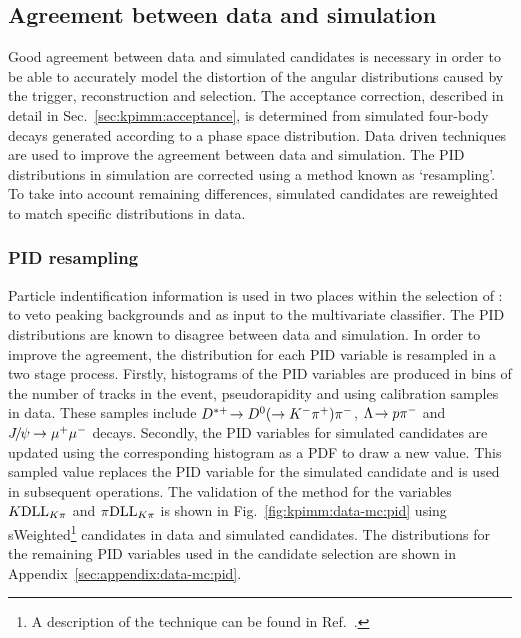 \subsection{Agreement between data and simulation}
\label{sec:kpimm:data-mc}

Good agreement between data and simulated candidates is necessary in order to be able to accurately model the distortion of the angular distributions caused by the trigger, reconstruction and selection. The acceptance correction, described in detail in Sec.~\ref{sec:kpimm:acceptance}, is determined from simulated four-body \BdToKpimm decays generated according to a phase space distribution. Data driven techniques are used to improve the agreement between data and simulation. The PID distributions in simulation are corrected using a method known as `resampling'. To take into account remaining differences, simulated candidates are reweighted to match specific distributions in data.

\subsubsection{PID resampling}
\label{sec:kpimm:data-mc:resample}

Particle indentification information is used in two places within the selection of \BdToKpimm: to veto peaking backgrounds and as input to the multivariate classifier. The PID distributions are known to disagree between data and simulation. In order to improve the agreement, the distribution for each PID variable is resampled in a two stage process. Firstly, histograms of the PID variables are produced in bins of the number of tracks in the event, pseudorapidity and \pt using calibration samples in data. These samples include ${{D}^{*+}}\!\rightarrow {\ensuremath{{D}^0}}(\rightarrow{\ensuremath{{K}^-}}{\ensuremath{{\pi}^+}}){{\pi}^-}$, ${\Lambda}\!\rightarrow {\ensuremath{p}}{\ensuremath{{\pi}^-}}$ and ${{J\mskip -3mu/\mskip -2mu\psi\mskip 2mu}}\!\rightarrow {\ensuremath{\mu^+\mu^-}}$ decays. Secondly, the PID variables for simulated candidates are updated using the corresponding histogram as a PDF to draw a new value. This sampled value replaces the PID variable for the simulated candidate and is used in subsequent operations. The validation of the method for the variables ${K}\mathrm{DLL}_{{K}{\pi}}$ and ${\pi}\mathrm{DLL}_{{K}{\pi}}$ is shown in Fig.~\ref{fig:kpimm:data-mc:pid} using sWeighted\footnote{A description of the \sPlot technique can be found in Ref.~\cite{splot}.} \BdToJPsiKst candidates in data and simulated \BdToJPsiKst candidates. The distributions for the remaining PID variables used in the candidate selection are shown in Appendix~\ref{sec:appendix:data-mc:pid}.

